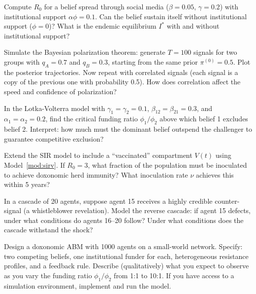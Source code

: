 \begin{exercise}
Compute $R_0$ for a belief spread through social media ($\beta = 0.05$, $\gamma = 0.2$) with institutional support $\alpha\phi = 0.1$.
Can the belief sustain itself without institutional support ($\phi = 0$)?
What is the endemic equilibrium $I^*$ with and without institutional support?
\end{exercise}

\begin{exercise}
Simulate the Bayesian polarization theorem: generate $T = 100$ signals for two groups with $q_A = 0.7$ and $q_B = 0.3$, starting from the same prior $\pi^{(0)} = 0.5$.
Plot the posterior trajectories.
Now repeat with correlated signals (each signal is a copy of the previous one with probability 0.5).
How does correlation affect the speed and confidence of polarization?
\end{exercise}

\begin{exercise}
In the Lotka-Volterra model with $\gamma_1 = \gamma_2 = 0.1$, $\beta_{12} = \beta_{21} = 0.3$, and $\alpha_1 = \alpha_2 = 0.2$, find the critical funding ratio $\phi_1 / \phi_2$ above which belief 1 excludes belief 2.
Interpret: how much must the dominant belief outspend the challenger to guarantee competitive exclusion?
\end{exercise}

\begin{exercise}
Extend the SIR model to include a ``vaccinated'' compartment $V(t)$ using Model~\ref{mod:sirv}.
If $R_0 = 3$, what fraction of the population must be inoculated to achieve doxonomic herd immunity?
What inoculation rate $\nu$ achieves this within 5 years?
\end{exercise}

\begin{exercise}
\label{ex:ch11-cascade-fragility}
In a cascade of 20 agents, suppose agent 15 receives a highly credible counter-signal (a whistleblower revelation).
Model the reverse cascade: if agent 15 defects, under what conditions do agents 16--20 follow?
Under what conditions does the cascade withstand the shock?
\end{exercise}

\begin{exercise}
\label{ex:ch11-abm}
Design a doxonomic ABM with 1000 agents on a small-world network.
Specify: two competing beliefs, one institutional funder for each, heterogeneous resistance profiles, and a feedback rule.
Describe (qualitatively) what you expect to observe as you vary the funding ratio $\phi_1/\phi_2$ from 1:1 to 10:1.
If you have access to a simulation environment, implement and run the model.
\end{exercise}

